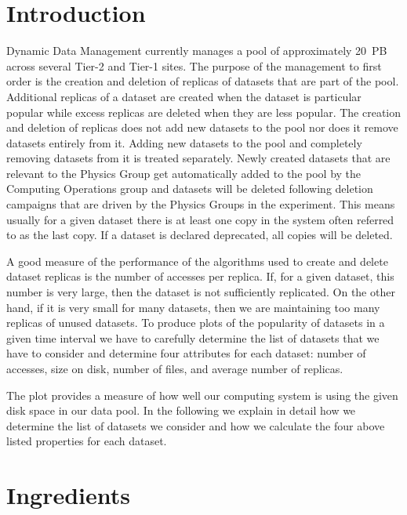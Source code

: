\tableofcontents

\section{Introduction}\label{sec:introduction}

Dynamic Data Management currently manages a pool of approximately 20~PB across
several Tier-2 and Tier-1 sites. The purpose of the management to first order is
the creation and deletion of replicas of datasets that are part of the pool.
Additional replicas of a dataset are created when the dataset is particular
popular while excess replicas are deleted when they are less popular. The
creation and deletion of replicas does not add new datasets to the pool nor does
it remove datasets entirely from it. Adding new datasets to the pool and
completely removing datasets from it is treated separately. Newly created
datasets that are relevant to the Physics Group get automatically added to the
pool by the Computing Operations group and datasets will be deleted following
deletion campaigns that are driven by the Physics Groups in the experiment.
This means usually for a given dataset there is at least one copy in the system
often referred to as the last copy. If a dataset is declared deprecated, all
copies will be deleted.

A good measure of the performance of the algorithms used to create and delete
dataset replicas is the number of accesses per replica. If, for a given dataset,
this number is very large, then the dataset is not sufficiently replicated. On
the other hand, if it is very small for many datasets, then we are maintaining
too many replicas of unused datasets. To produce plots of the popularity of
datasets in a given time interval we have to carefully determine the list of
datasets that we have to consider and determine four attributes for each
dataset: number of accesses, size on disk, number of files, and average number
of replicas.

The plot provides a measure of how well our computing system is using the given
disk space in our data pool. In the following we explain in detail how we
determine the list of datasets we consider and how we calculate the four above
listed properties for each dataset.

\section{Ingredients}

